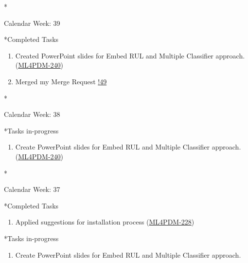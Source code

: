 \documentclass[11pt,a4paper]{article}
\begin{document}
\newpage
\begin{section}*{Calendar Week: 39 \hfill \date{30 September, 2021}}
 \begin{refsection}
   \begin{subsection}*{Completed Tasks}
     \begin{enumerate}
       \item
             Created PowerPoint slides for Embed RUL and Multiple Classifier approach. (\href{https://ml4pdm.atlassian.net/browse/ML4PDM-240}{ML4PDM-240})
       \item
             Merged my Merge Request \href{https://git.cs.uni-paderborn.de/machine-learning-for-predictive-maintenance/code/-/merge_requests/49}{!49}
     \end{enumerate}
   \end{subsection}
 \end{refsection}
\end{section}

\newpage
\begin{section}*{Calendar Week: 38 \hfill \date{24 September, 2021}}
 \begin{refsection}
   \begin{subsection}*{Tasks in-progress}
     \begin{enumerate}
       \item
             Create PowerPoint slides for Embed RUL and Multiple Classifier approach. (\href{https://ml4pdm.atlassian.net/browse/ML4PDM-240}{ML4PDM-240})
     \end{enumerate}
   \end{subsection}
 \end{refsection}
\end{section}

\newpage
\begin{section}*{Calendar Week: 37 \hfill \date{17 September, 2021}}
 \begin{refsection}
   \begin{subsection}*{Completed Tasks}
     \begin{enumerate}
       \item
             Applied suggestions for installation process  (\href{https://ml4pdm.atlassian.net/browse/ML4PDM-228}{ML4PDM-228})
     \end{enumerate}
   \end{subsection}
   \begin{subsection}*{Tasks in-progress}
     \begin{enumerate}
       \item
             Create PowerPoint slides for Embed RUL and Multiple Classifier approach.
     \end{enumerate}
   \end{subsection}
 \end{refsection}
\end{section}
\end{document}

